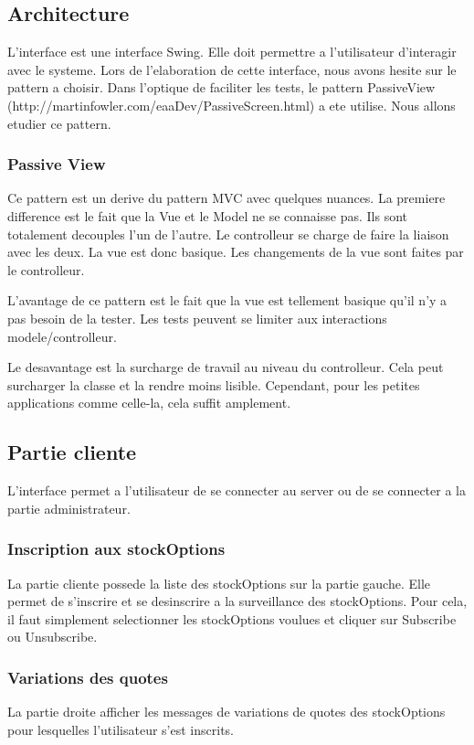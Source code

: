 \subsection{Architecture}
L'interface est une interface Swing. Elle doit permettre a l'utilisateur d'interagir avec le systeme. Lors de l'elaboration de cette interface, nous avons hesite sur le pattern a choisir. Dans l'optique de faciliter les tests, le pattern PassiveView (http://martinfowler.com/eaaDev/PassiveScreen.html) a ete utilise. Nous allons etudier ce pattern.
\subsubsection{Passive View}
Ce pattern est un derive du pattern MVC avec quelques nuances. La premiere difference est le fait que la Vue et le Model ne se connaisse pas. Ils sont totalement decouples l'un de l'autre. Le controlleur se charge de faire la liaison avec les deux. La vue est donc basique. Les changements de la vue sont faites par le controlleur.

L'avantage de ce pattern est le fait que la vue est tellement basique qu'il n'y a pas besoin de la tester. Les tests peuvent se limiter aux interactions modele/controlleur.

Le desavantage est la surcharge de travail au niveau du controlleur. Cela peut surcharger la classe et la rendre moins lisible. Cependant, pour les petites applications comme celle-la, cela suffit amplement.
\subsection{Partie cliente}
L'interface permet a l'utilisateur de se connecter au server ou de se connecter a la partie administrateur.
\subsubsection{Inscription aux stockOptions}
La partie cliente possede la liste des stockOptions sur la partie gauche. Elle permet de s'inscrire et se desinscrire a la surveillance des stockOptions. Pour cela, il faut simplement selectionner les stockOptions voulues et cliquer sur Subscribe ou Unsubscribe.
\subsubsection{Variations des quotes}
La partie droite afficher les messages de variations de quotes des stockOptions pour lesquelles l'utilisateur s'est inscrits.
